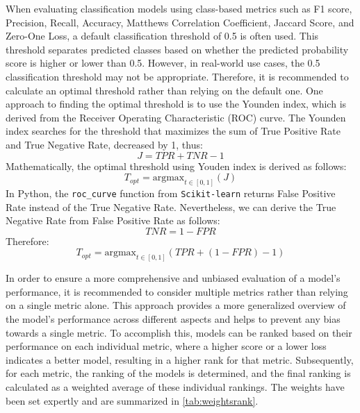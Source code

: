         When evaluating classification models using class-based metrics such as F1 score, Precision, Recall, Accuracy, Matthews Correlation Coefficient, Jaccard Score, and Zero-One Loss, a default classification threshold of 0.5 is often used. This threshold separates predicted classes based on whether the predicted probability score is higher or lower than 0.5.
        However, in real-world use cases, the 0.5 classification threshold may not be appropriate. Therefore, it is recommended to calculate an optimal threshold rather than relying on the default one.
        One approach to finding the optimal threshold is to use the Younden index, which is derived from the Receiver Operating Characteristic (ROC) curve. The Younden index searches for the threshold that maximizes the sum of True Positive Rate and True Negative Rate, decreased by 1, thus:
        \begin{equation}\label{eq}
        J = TPR + TNR - 1
        \end{equation}
        Mathematically, the optimal threshold using Youden index is derived as follows:
        \begin{equation}\label{eq}
            T_{opt} = \text{argmax}_{t \in [0, 1]}\left(J\right)
        \end{equation}
        In Python, the \lstinline{roc_curve} function from \lstinline{Scikit-learn} returns False Positive Rate instead of the True Negative Rate. Nevertheless, we can derive the True Negative Rate from False Positive Rate as follows:
        \begin{equation}\label{eq}
            TNR =  1-FPR
        \end{equation}
        Therefore:
        \begin{equation}\label{eq}
            T_{opt} = \text{argmax}_{t \in [0, 1]}\left(TPR +  \left(1-FPR\right) - 1\right)
        \end{equation}
        
        In order to ensure a more comprehensive and unbiased evaluation of a model's performance, it is recommended to consider multiple metrics rather than relying on a single metric alone. This approach provides a more generalized overview of the model's performance across different aspects and helps to prevent any bias towards a single metric.
        To accomplish this, models can be ranked based on their performance on each individual metric, where a higher score or a lower loss indicates a better model, resulting in a higher rank for that metric. Subsequently, for each metric, the ranking of the models is determined, and the final ranking is calculated as a weighted average of these individual rankings.
        The weights have been set expertly and are summarized in \autoref{tab:weightsrank}.
        
